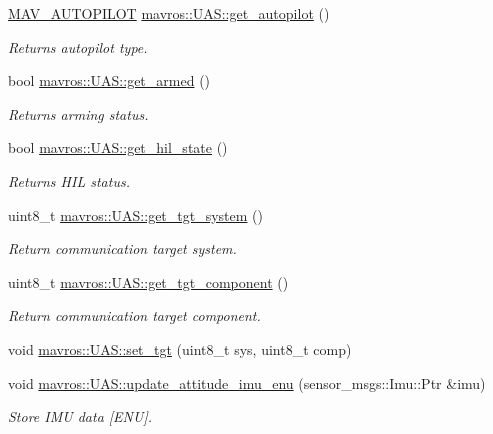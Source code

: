 \begin{DoxyCompactItemize}
\mbox{\hyperlink{group__nodelib_gab6b5a708dff72c3923fd71d8d4730e3e}{M\+A\+V\+\_\+\+A\+U\+T\+O\+P\+I\+L\+OT}} \mbox{\hyperlink{group__nodelib_gad61deec4e10469fc9eb40dcc3a36aab1}{mavros\+::\+U\+A\+S\+::get\+\_\+autopilot}} ()
\begin{DoxyCompactList}\small\item\em Returns autopilot type. \end{DoxyCompactList}\item 
bool \mbox{\hyperlink{group__nodelib_gae941bfe1ef1afd1cb6608028a38e1c27}{mavros\+::\+U\+A\+S\+::get\+\_\+armed}} ()
\begin{DoxyCompactList}\small\item\em Returns arming status. \end{DoxyCompactList}\item 
bool \mbox{\hyperlink{group__nodelib_gae6fe5bb4dc5d02536c8b7970577b22d7}{mavros\+::\+U\+A\+S\+::get\+\_\+hil\+\_\+state}} ()
\begin{DoxyCompactList}\small\item\em Returns H\+IL status. \end{DoxyCompactList}\item 
uint8\+\_\+t \mbox{\hyperlink{group__nodelib_ga9d8412c7b6aada6715ded8eefcd6a517}{mavros\+::\+U\+A\+S\+::get\+\_\+tgt\+\_\+system}} ()
\begin{DoxyCompactList}\small\item\em Return communication target system. \end{DoxyCompactList}\item 
uint8\+\_\+t \mbox{\hyperlink{group__nodelib_ga1b874777bb6378d1fec2d3498f95884c}{mavros\+::\+U\+A\+S\+::get\+\_\+tgt\+\_\+component}} ()
\begin{DoxyCompactList}\small\item\em Return communication target component. \end{DoxyCompactList}\item 
void \mbox{\hyperlink{group__nodelib_ga87eb84159321497e07dc4c739bdb727d}{mavros\+::\+U\+A\+S\+::set\+\_\+tgt}} (uint8\+\_\+t sys, uint8\+\_\+t comp)
\item 
void \mbox{\hyperlink{group__nodelib_gaca39c9b4dfce83909e2bde0796564341}{mavros\+::\+U\+A\+S\+::update\+\_\+attitude\+\_\+imu\+\_\+enu}} (sensor\+\_\+msgs\+::\+Imu\+::\+Ptr \&imu)
\begin{DoxyCompactList}\small\item\em Store I\+MU data \mbox{[}E\+NU\mbox{]}. \end{DoxyCompactList}\item 

\end{DoxyCompactItemize}
